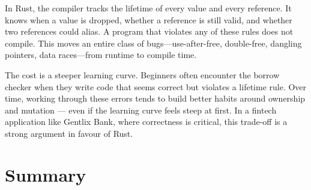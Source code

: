 In Rust, the compiler tracks the lifetime of every value and every reference.
It knows when a value is dropped, whether a reference is still valid, and
whether two references could alias. A program that violates any of these rules
does not compile. This moves an entire class of bugs---use-after-free, double-free,
dangling pointers, data races---from runtime to compile time.

The cost is a steeper learning curve. Beginners often encounter the borrow
checker when they write code that seems correct but violates a lifetime rule.
Over time, working through these errors tends to build better habits around 
ownership and mutation — even if the learning curve feels steep at first. 
In a fintech application like Gentlix Bank, where correctness is critical, 
this trade-off is a strong argument in favour of Rust.

\section*{Summary}

